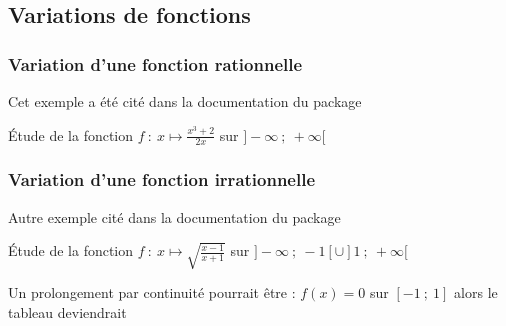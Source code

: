 \subsection{Variations de fonctions}
 \subsubsection{Variation d'une fonction rationnelle}
 
 Cet exemple a été cité dans la documentation du package 

 Étude de la fonction $f~:~ x \longmapsto \frac{x^3+2}{2x}$ sur $]-\infty~;~+\infty[$
 
\begin{tkzexample}
\end{tkzexample}  


\subsubsection{Variation d'une fonction irrationnelle}
 
Autre exemple  cité dans la documentation du package 

Étude de la fonction $f~:~ x \longmapsto \sqrt{\frac{x-1}{x+1}}$ sur $]-\infty~;~-1[\cup ]1~;~+\infty[$

\begin{tkzexample} 
\end{tkzexample}  

Un prolongement par continuité pourrait être : $f(x)=0$ sur $[-1~;~1]$ alors le tableau deviendrait

\begin{tkzexample} 
\end{tkzexample}  


